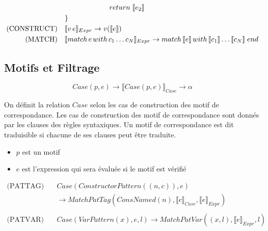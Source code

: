 \documentclass[
  12pt,
]{article}
\providecommand{\tightlist}{%
  \setlength{\itemsep}{0pt}\setlength{\parskip}{0pt}}
\begin{document}
\begin{align*}
                           & \quad \quad \quad \quad \quad \quad \; return \;\llbracket e_2 \rrbracket                                                                                                                                            \\
                           & \}                                                                                                                                                                             \\
  \text{(CONSTRUCT)} \quad & \llbracket v \, e \rrbracket_{Expr} \rightarrow v(\llbracket e \rrbracket)                                                                                                                \\
  \text{(MATCH)} \quad     & \llbracket match \, e \, with \, c_1 \dots c_N  \rrbracket_{Expr}\rightarrow  match \, \llbracket e \rrbracket \, with \, \llbracket c_1 \rrbracket \dots \llbracket c_N \rrbracket \; end                        \\
\end{align*}
\subsection{Motifs et Filtrage}\label{motifs-et-filtrage}

\[ Case(p,e) \rightarrow \llbracket Case(p,e) \rrbracket_{Case} \rightarrow \alpha \]

On définit la relation \({Case}\) selon les cas de construction
des motif de correspondance. Les cas de construction des motif de
correspondance sont donnés par les clauses des règles syntaxiques. Un
motif de correspondance est dit traduisible si chacune de ses clauses
peut être traduite.
\begin{itemize}
  \tightlist
  \item
        \(p\) est un motif
  \item
        \(e\) est l'expression qui sera évaluée si le motif est vérifié
\end{itemize}
\begin{align*}
  \text{(PATTAG)} \quad & Case(ConstructorPattern((n,c)), e)
  \\ &\rightarrow  MatchPatTag(ConsNamed(n), \llbracket c \rrbracket_{Case}, \llbracket e \rrbracket_{Expr})        \\
  \\
  \text{(PATVAR)} \quad & Case(VarPattern(x), e, l)
  \rightarrow  MatchPatVar((x, l), \llbracket e \rrbracket_{Expr}, l)
\end{align*}
\end{document}

